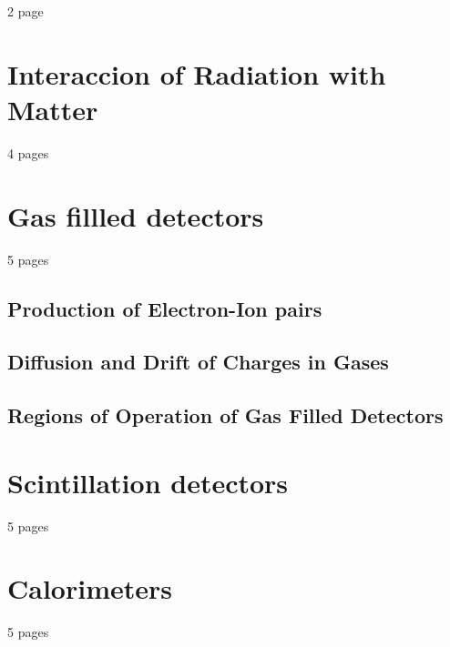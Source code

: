 2 page
\section{Interaccion of Radiation with Matter}
4 pages
\section{Gas fillled detectors}
5 pages
\subsection{Production of Electron-Ion pairs}
\subsection{Diffusion and Drift of Charges in Gases}
\subsection{Regions of Operation of Gas Filled Detectors}
\section{Scintillation detectors}
5 pages
\section{Calorimeters}
5 pages




